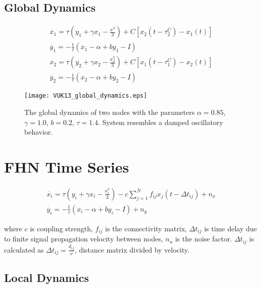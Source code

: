 \documentclass[12pt]{article}
\begin{document}
\subsection{Global Dynamics}

\begin{subequations}
 \begin{align}\dot{x_1} = \tau (y_1 + \gamma x_1 - \frac{x^3}{3}) + C [x_2(t-\tau_2^C)-x_1(t)]  \label{eqn: frobenius 17}\\  \dot{y_1} = -\frac{1}{\tau} (x_1 - \alpha + b y_1 - I ) \label{eqn: frobenius 18} \\ \dot{x_2} = \tau (y_2 + \gamma x_2 - \frac{x_2^3}{3}) + C [x_1(t-\tau_1^C)-x_2(t)] \label{eqn: frobenius 18} \\  \dot{y_2} = -\frac{1}{\tau} (x_2 - \alpha + b y_2 - I ) \end{align} 
\end{subequations}

\begin{figure}[h!]
	\centering
	\texttt{[image: VUK13\_global\_dynamics.eps]}
		\caption{The global dynamics of two nodes with the parameters $\alpha = 0.85$, $\gamma=1.0$, $b=0.2$, $\tau = 1.4$. System resembles a damped oscillatory behavior.}
\end{figure}

\section{FHN Time Series}

\begin{subequations}
 \begin{align}\dot{x_i} = \tau (y_i + \gamma x_i - \frac{x_i^3}{3}) -c \sum_{j=1}^N f_{ij}x_j(t - \Delta t_{ij}) +n_x \label{eqn: frobenius 17}\\  \dot{y_i} = -\frac{1}{\tau} (x_i - \alpha + b y_i - I ) +n_y \label{eqn: frobenius 18}   \end{align} 
\end{subequations}

where $c$ is coupling strength, $f_{ij}$ is the connectivity matrix, $\Delta t_{ij}$ is time delay due to finite signal propagation velocity between nodes, $n_u$ is the noise factor. $\Delta t_{ij}$ is calculated as $\Delta t_{ij}=\frac{d_{ij}}{\nu}$, distance matrix divided by velocity. 

\newpage

\subsection{Local Dynamics}
\end{document}
